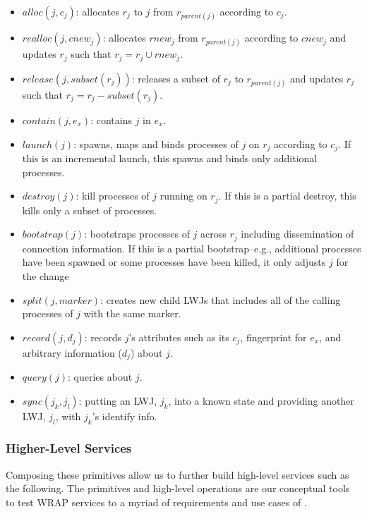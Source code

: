 \begin{itemize}

\item{$alloc(j, c_j)$: allocates $r_j$ to $j$ from $r_{parent(j)}$ according to $c_j$.}

\item{$realloc(j, cnew_j)$: allocates $rnew_j$ from $r_{parent(j)}$ according to $cnew_j$ and updates $r_j$ such that $r_j = r_j \cup rnew_j$.}

\item{$release(j, subset(r_j))$: releases a subset of $r_j$ to $r_{parent(j)}$ and updates $r_j$ such that $r_j = r_j - subset(r_j)$.}

\item{$contain(j, e_x)$: contains $j$ in $e_x$.}

\item{$launch(j)$: spawns, maps and binds processes of $j$ on $r_j$ according to $c_j$. If this is an incremental launch, this spawns and binds only additional processes.}

\item{$destroy(j)$: kill processes of $j$ running on $r_j$. If this is a partial destroy, this kills only a subset of processes.}

\item{$bootstrap(j)$: bootstraps processes of $j$ across $r_j$ including dissemination of connection information. If this is a partial bootstrap--e.g., additional processes have been spawned or some processes have been killed, it only adjusts $j$ for the change}

\item{$split(j, marker)$: creates new child LWJs that includes all of the calling processes of $j$ with the same marker.}

\item{$record(j, d_j)$: records $j$'s attributes such as its $c_j$, fingerprint for $e_x$, and arbitrary information ($d_j$) about $j$.}

\item{$query(j)$: queries about $j$.}

\item{$sync(j_k, j_l)$: putting an LWJ, $j_k$, into a known state and providing another LWJ, $j_l$, with $j_k$'s identify info.}

\end{itemize}

\subsubsection{Higher-Level Services}
\label{sect:hiop}
Composing these primitives allow us to further build high-level services
such as the following. The primitives and high-level operations are our 
conceptual tools to test WRAP services to a myriad of requirements and use cases of \ngrm.

